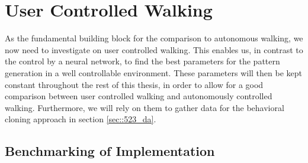 \section{User Controlled Walking}
\label{sec::51_uc}
As the fundamental building block for the comparison to autonomous walking, we now need to investigate on user controlled walking. This enables us, in contrast to the control by a neural network, to find the best parameters for the pattern generation in a well controllable environment. These parameters will then be kept constant throughout the rest of this thesis, in order to allow for a good comparison between user controlled walking and autonomously controlled walking. Furthermore, we will rely on them to gather data for the behavioral cloning approach in section \ref{sec::523_da}.
\subsection{Benchmarking of Implementation}

